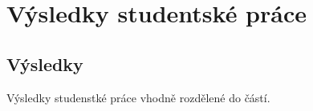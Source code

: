 \chapter{Výsledky studentské práce}

\section{Výsledky}

Výsledky studenstké práce vhodně rozdělené do částí.

